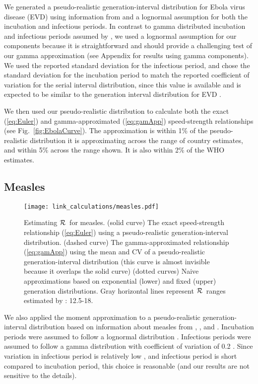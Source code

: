 \documentclass[12pt]{article}
\newcommand{\RR}{\ensuremath{{\cal R}}}
\newcommand{\eref}[1]{(\ref{eq:#1})}
\newcommand{\fref}[1]{Fig.~\ref{fig:#1}}
\begin{document}
We generated a pseudo-realistic generation-interval distribution for Ebola virus disease (EVD) using information from \cite{AylwBarb14} and a lognormal assumption for both the incubation and infectious periods.
In contrast to gamma distributed incubation and infectious periods assumed by \cite{AylwBarb14}, we used a lognormal assumption for our components because it is straightforward and should provide a challenging test of our gamma approximation (see Appendix for results using gamma components). 
We used the reported standard deviation for the infectious period, and chose the standard deviation for the incubation period to match the reported coefficient of variation for the serial interval distribution, since this value is available and is expected to be similar to the generation interval distribution for EVD \cite{AylwBarb14}.

We then used our pseudo-realistic distribution to calculate both the exact \eref{Euler} and gamma-approximated \eref{gamApp} speed-strength relationships (see \fref{EbolaCurve}). The approximation is within 1\% of the pseudo-realistic distribution it is approximating across the range of country estimates, and within 5\% across the range shown. It is also within 2\% of the WHO estimates. 

\subsection{Measles}
\label{MeaslesEx}

\begin{figure}[htbp] \centering
	\texttt{[image: link\_calculations/measles.pdf]}
	\caption{Estimating \RR~for measles.
		(solid curve) The exact speed-strength relationship \eref{Euler} using a pseudo-realistic generation-interval distribution.
		(dashed curve) The gamma-approximated relationship \eref{gamApp} using the mean and CV of a pseudo-realistic generation-interval distribution (this curve is almost invisible because it overlaps the solid curve)
		(dotted curves) Naive approximations based on exponential (lower) and fixed (upper) generation distributions.
		Gray horizontal lines represent \RR\ ranges estimated by \cite{anderson1982directly}: 12.5-18.
	}
	\label{fig:measlesCurve}
\end{figure}

We also applied the moment approximation to a pseudo-realistic generation-interval distribution based on information about measles from \cite{LessReic09}, \cite{Lloy01}, and \cite{anderson1982directly}. 
Incubation periods were assumed to follow a lognormal distribution \cite{LessReic09}. 
Infectious periods were assumed to follow a gamma distribution with coefficient of variation of 0.2 \cite{simpson1952infectiousness,Lloy01,KeelGren97}. Since variation in infectious period is relatively low \cite{simpson1952infectiousness,KeelGren97}, and infectious period is short compared to incubation period, this choice is reasonable (and our results are not sensitive to the details).
\end{document}
